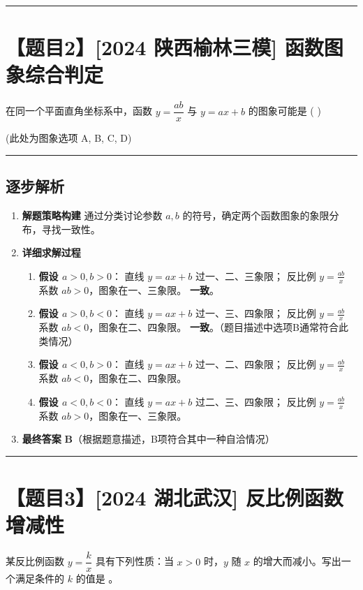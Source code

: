 \documentclass[UTF8]{ctexart}
\newenvironment{redenv}{\color{red}}{}
\newenvironment{detailedanalysis}{%
    \color{red}
    \begin{enumerate}[label=\textbf{第\arabic*步：}, leftmargin=*, align=left, itemsep=1.5ex]
}{%
    \end{enumerate}
}
\newcommand{\problemrule}{\noindent\rule{\textwidth}{1.5pt}\vspace{-0.8em}}
\newcommand{\analysisrule}{\noindent\rule{\textwidth}{0.8pt}\vspace{-0.8em}}
\begin{document}
\problemrule
\section*{【题目2】[2024 陕西榆林三模] 函数图象综合判定}
在同一个平面直角坐标系中，函数 $y=\dfrac{ab}{x}$ 与 $y=ax+b$ 的图象可能是 ( \quad )
\begin{center}
    (此处为图象选项 A, B, C, D)
\end{center}

\begin{redenv}
\analysisrule
\subsection*{逐步解析}

\begin{detailedanalysis}
\item \textbf{解题策略构建}
通过分类讨论参数 $a, b$ 的符号，确定两个函数图象的象限分布，寻找一致性。

\item \textbf{详细求解过程}
\begin{enumerate}[label=\arabic*)]
    \item \textbf{假设 $a>0, b>0$}：
    直线 $y=ax+b$ 过一、二、三象限；
    反比例 $y=\frac{ab}{x}$ 系数 $ab>0$，图象在一、三象限。
    \textbf{一致}。

    \item \textbf{假设 $a>0, b<0$}：
    直线 $y=ax+b$ 过一、三、四象限；
    反比例 $y=\frac{ab}{x}$ 系数 $ab<0$，图象在二、四象限。
    \textbf{一致}。（题目描述中选项B通常符合此类情况）

    \item \textbf{假设 $a<0, b>0$}：
    直线 $y=ax+b$ 过一、二、四象限；
    反比例 $y=\frac{ab}{x}$ 系数 $ab<0$，图象在二、四象限。

    \item \textbf{假设 $a<0, b<0$}：
    直线 $y=ax+b$ 过二、三、四象限；
    反比例 $y=\frac{ab}{x}$ 系数 $ab>0$，图象在一、三象限。
\end{enumerate}

\item \textbf{最终答案}
\textbf{B}（根据题意描述，B项符合其中一种自洽情况）
\end{detailedanalysis}
\end{redenv}

\problemrule
\section*{【题目3】[2024 湖北武汉] 反比例函数增减性}
某反比例函数 $y=\dfrac{k}{x}$ 具有下列性质：当 $x>0$ 时，$y$ 随 $x$ 的增大而减小。写出一个满足条件的 $k$ 的值是 \underline{\hspace{2cm}}。
\end{document}
